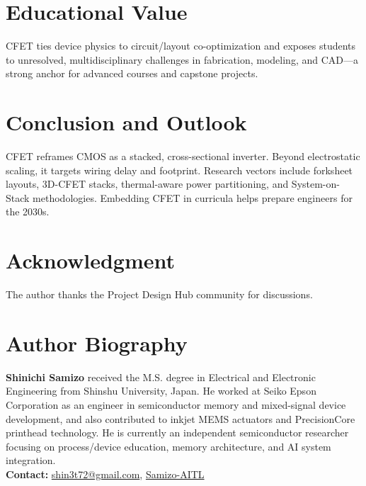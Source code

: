 \documentclass[conference]{IEEEtran}
\begin{document}
\section{Educational Value}
CFET ties device physics to circuit/layout co-optimization and exposes students to unresolved, multidisciplinary challenges in fabrication, modeling, and CAD---a strong anchor for advanced courses and capstone projects.

\section{Conclusion and Outlook}
CFET reframes CMOS as a stacked, cross-sectional inverter.
Beyond electrostatic scaling, it targets wiring delay and footprint.
Research vectors include forksheet layouts, 3D-CFET stacks, thermal-aware power partitioning, and System-on-Stack methodologies.
Embedding CFET in curricula helps prepare engineers for the 2030s.

\section*{Acknowledgment}
The author thanks the Project Design Hub community for discussions.




\section*{Author Biography}
\noindent\textbf{Shinichi Samizo}
received the M.S. degree in Electrical and Electronic Engineering from Shinshu University, Japan.
He worked at Seiko Epson Corporation as an engineer in semiconductor memory and mixed-signal device development, and also contributed to inkjet MEMS actuators and PrecisionCore printhead technology.
He is currently an independent semiconductor researcher focusing on process/device education, memory architecture, and AI system integration.\\[2pt]
\textbf{Contact:} \href{mailto:shin3t72@gmail.com}{shin3t72@gmail.com}, \href{https://github.com/Samizo-AITL}{Samizo-AITL}
\end{document}
